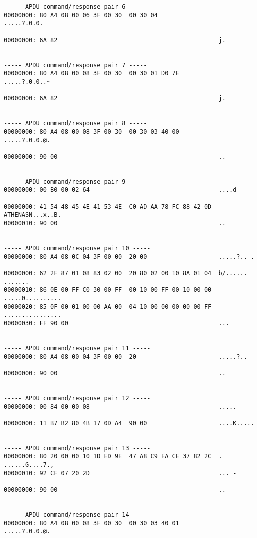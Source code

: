 \documentclass[bsc,frontabs,twoside,singlespacing,parskip,deptreport]{infthesis}     %
\begin{document}
\begin{verbatim}
----- APDU command/response pair 6 -----
00000000: 80 A4 08 00 06 3F 00 30  00 30 04                 .....?.0.0.

00000000: 6A 82                                             j.


----- APDU command/response pair 7 -----
00000000: 80 A4 08 00 08 3F 00 30  00 30 01 D0 7E           .....?.0.0..~

00000000: 6A 82                                             j.


----- APDU command/response pair 8 -----
00000000: 80 A4 08 00 08 3F 00 30  00 30 03 40 00           .....?.0.0.@.

00000000: 90 00                                             ..


----- APDU command/response pair 9 -----
00000000: 00 B0 00 02 64                                    ....d

00000000: 41 54 48 45 4E 41 53 4E  C0 AD AA 78 FC 88 42 0D  ATHENASN...x..B.
00000010: 90 00                                             ..


----- APDU command/response pair 10 -----
00000000: 80 A4 08 0C 04 3F 00 00  20 00                    .....?.. .

00000000: 62 2F 87 01 08 83 02 00  20 80 02 00 10 8A 01 04  b/...... .......
00000010: 86 0E 00 FF C0 30 00 FF  00 10 00 FF 00 10 00 00  .....0..........
00000020: 85 0F 00 01 00 00 AA 00  04 10 00 00 00 00 00 FF  ................
00000030: FF 90 00                                          ...


----- APDU command/response pair 11 -----
00000000: 80 A4 08 00 04 3F 00 00  20                       .....?.. 

00000000: 90 00                                             ..


----- APDU command/response pair 12 -----
00000000: 00 84 00 00 08                                    .....

00000000: 11 B7 B2 80 4B 17 0D A4  90 00                    ....K.....


----- APDU command/response pair 13 -----
00000000: 80 20 00 00 10 1D ED 9E  47 A8 C9 EA CE 37 82 2C  . ......G....7.,
00000010: 92 CF 07 20 2D                                    ... -

00000000: 90 00                                             ..


----- APDU command/response pair 14 -----
00000000: 80 A4 08 00 08 3F 00 30  00 30 03 40 01           .....?.0.0.@.


\end{verbatim}
\end{document}
